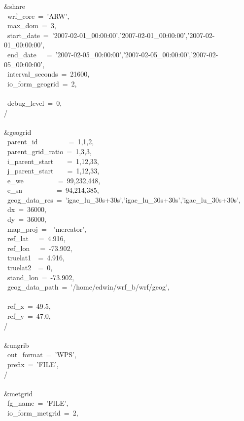 \&share\\
~wrf\_core~=~'ARW',\\
~max\_dom~=~3,\\
~start\_date~=~'2007-02-01\_00:00:00','2007-02-01\_00:00:00','2007-02-01\_00:00:00',\\
~end\_date~~~=~'2007-02-05\_00:00:00','2007-02-05\_00:00:00','2007-02-05\_00:00:00',\\
~interval\_seconds~=~21600,\\
~io\_form\_geogrid~=~2,\\
\\
~debug\_level~=~0,\\
/\\
\\
\&geogrid\\
~parent\_id~~~~~~~~~=~1,1,2,\\
~parent\_grid\_ratio~=~1,3,3,\\
~i\_parent\_start~~~~=~1,12,33,\\
~j\_parent\_start~~~~=~1,12,33,\\
~e\_we~~~~~~~~~~=~99,232,448,\\
~e\_sn~~~~~~~~~~=~94,214,385,\\
~geog\_data\_res~=~'igac\_lu\_30s+30s','igac\_lu\_30s+30s','igac\_lu\_30s+30s',\\
~dx~=~36000,\\
~dy~=~36000,\\
~map\_proj~=~~'mercator',\\
~ref\_lat~~~=~4.916,\\
~ref\_lon~~~=~-73.902,\\
~truelat1~~=~4.916,\\
~truelat2~~=~0,\\
~stand\_lon~=~-73.902,\\
~geog\_data\_path~=~'/home/edwin/wrf\_b/wrf/geog',\\
\\
~ref\_x~=~49.5,\\
~ref\_y~=~47.0,\\
/\\
\\
\&ungrib\\
~out\_format~=~'WPS',\\
~prefix~=~'FILE',\\
/\\
\\
\&metgrid\\
~fg\_name~=~'FILE',\\
~io\_form\_metgrid~=~2,\\
